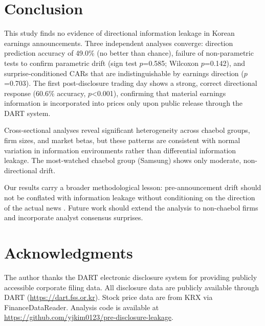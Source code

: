 \documentclass[review,authoryear]{elsarticle}
\begin{document}
\section{Conclusion}
\label{sec:conclusion}

This study finds no evidence of directional information leakage in Korean earnings announcements. Three independent analyses converge: direction prediction accuracy of 49.0\% (no better than chance), failure of non-parametric tests to confirm parametric drift (sign test $p$=0.585; Wilcoxon $p$=0.142), and surprise-conditioned CARs that are indistinguishable by earnings direction ($p$=0.703). The first post-disclosure trading day shows a strong, correct directional response (60.6\% accuracy, $p$<0.001), confirming that material earnings information is incorporated into prices only upon public release through the DART system.

Cross-sectional analyses reveal significant heterogeneity across chaebol groups, firm sizes, and market betas, but these patterns are consistent with normal variation in information environments rather than differential information leakage. The most-watched chaebol group (Samsung) shows only moderate, non-directional drift.

Our results carry a broader methodological lesson: pre-announcement drift should not be conflated with information leakage without conditioning on the direction of the actual news \citep{meulbroek1992comparison, bernile2016can, atiase1985predisclosure}. Future work should extend the analysis to non-chaebol firms and incorporate analyst consensus surprises.

\section*{Acknowledgments}

The author thanks the DART electronic disclosure system for providing publicly accessible corporate filing data. All disclosure data are publicly available through DART (\url{https://dart.fss.or.kr}). Stock price data are from KRX via FinanceDataReader. Analysis code is available at \url{https://github.com/yjkim0123/pre-disclosure-leakage}.



\end{document}
